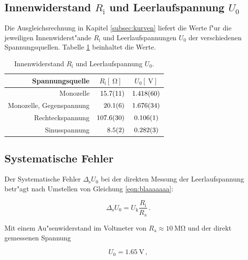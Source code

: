 	\clearpage

	\subsection{Innenwiderstand $R_\mathrm{i}$ und Leerlaufspannung $U_0$}
	\label{subsec:ri-u0}
		Die Ausgleichsrechnung in Kapitel \ref{subsec:kurven} liefert die Werte f"ur die jeweiligen Innenwiderst"ande $R_\mathrm{i}$ und Leerlaufspannungen $U_0$ der verschiedenen Spannungsquellen.
		Tabelle \ref{table:ri-u0} beinhaltet die Werte.

		\begin{table}[h!]
			\begin{center}
				\caption{Innenwiderstand $R_\mathrm{i}$ und Leerlaufspannung $U_0$. \label{table:ri-u0}}
				\begin{tabular}{|r|r|c|}
					\hline
						Spannungsquelle & \multicolumn{1}{|c|}{$R_\mathrm{i} [\SI{}{\ohm}]$} & $U_0 [\SI{}{\volt}]$ \\ 
					\hline 
					\hline
						Monozelle & $\SI{15.7 (11)}{}$ & $\SI{1.418 (60)}{}$ \\
						Monozelle, Gegenspannung & $\SI{20.1 (6)}{}$ & $\SI{1.676 (34)}{}$ \\
						Rechteckspannung & $\SI{107.6 (30)}{}$ & $\SI{.106 (1)}{}$ \\
						Sinusspannung & $\SI{8.5 (2)}{}$ & $\SI{.282 (3)}{}$ \\ 
					\hline 
				\end{tabular}
			\end{center}
		\end{table}

	\subsection{Systematische Fehler}
	\label{subsec:fehler}
		Der Systematische Fehler $\Delta_\mathrm{s} U_0$ bei der direkten Messung der Leerlaufspannung betr"agt nach Umstellen von Gleichung \eqref{eqn:blaaaaaaa}:

		\begin{equation*}
			\Delta_\mathrm{s} U_0 = U_\mathrm{k} \frac{R_\mathrm{i}}{R_\mathrm{a}} \,.
		\end{equation*}

		Mit einem Au"senwiderstand im Voltmeter von $R_\mathrm{a} \approx \SI{10}{\mega \ohm}$ und der direkt gemessenen Spannung

		\begin{equation*}
			U_0 = \SI{1.65}{\volt} \,,
		\end{equation*}
		
